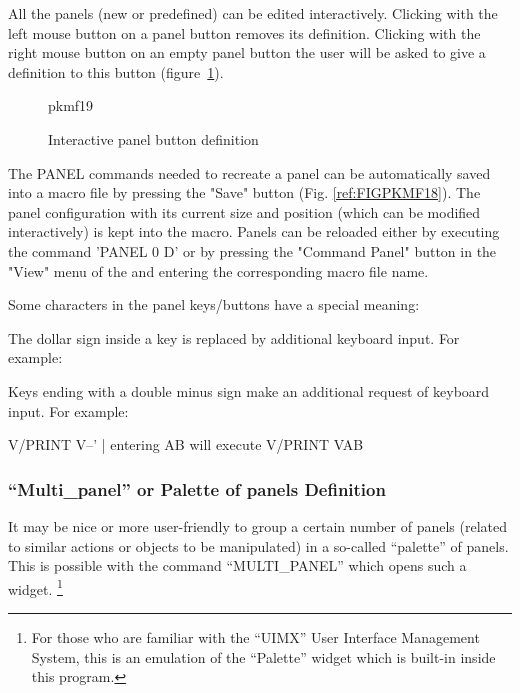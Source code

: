 All the panels (new or predefined) can be edited interactively.
Clicking with the left mouse button on a panel button removes its
definition.
Clicking with the right mouse button on an empty panel button the
user will be asked to give a definition to this button
(figure~\ref{fig-panel-button}).

\begin{figure}[htb] 
\hfill\hfill
\begin{PICTf}[.4]{pkmf19}
\end{PICTf}
\hfill
\caption{Interactive panel button definition
\label{fig-panel-button}}
\end{figure}
 
The PANEL commands needed to recreate a panel can be automatically
saved into a macro file by pressing the "Save" button  (Fig.
\ref{ref:FIGPKMF18}).  The panel  configuration with its current
size and position
(which can be modified interactively) is kept into the macro.
Panels can be reloaded either by executing the command 'PANEL 0 D'
or by pressing the "Command Panel" button in the "View" menu
of the \EW{} and entering the corresponding macro file name.

Some characters in the panel keys/buttons have a special meaning:
\vspace{-.5\baselineskip}
\begin{UL}
\item
The dollar sign inside a key is replaced by additional keyboard
input. For example:
\item
Keys ending with a double minus sign make an additional request
of keyboard input.  For example:
\begin{XMP}
       V/PRINT V--'     | entering AB will execute V/PRINT VAB
\end{XMP}
\end{UL}
 
\subsubsection{``Multi_panel'' or Palette of panels Definition}
 
It may be nice or more user-friendly to group a certain number of
panels (related to similar actions or objects to be manipulated)
in a so-called ``palette'' of panels.  This is possible with the
\KUIPMotif{} command ``MULTI_PANEL'' which opens such a widget.
\footnote{For those who are familiar with the ``UIMX'' User Interface
Management System, this is an emulation of the ``Palette'' widget
which is built-in inside this program.}
 
